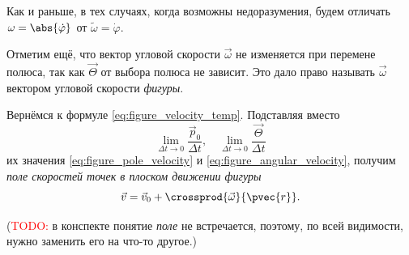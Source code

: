 Как и раньше, в тех случаях, когда возможны недоразумения, будем отличать
$\omega = \abs{\dot{\varphi}}$ от $\tilde{\omega} = \dot{\varphi}$.

Отметим ещё, что вектор угловой скорости $\vec{\omega}$ не изменяется при
перемене полюса, так как $\vec{\Theta}$ от выбора полюса не зависит. Это дало
право называть $\vec{\omega}$ вектором угловой скорости \textit{фигуры}.

Вернёмся к формуле \ref{eq:figure_velocity_temp}. Подставляя вместо
\begin{equation*}
  \lim_{\Delta t \to 0} \frac{\vec{p}_0}{\Delta t}, \quad \lim_{\Delta t \to 0}
  \frac{\vec{\Theta}}{\Delta t}
\end{equation*}
их значения \ref{eq:figure_pole_velocity} и \ref{eq:figure_angular_velocity},
получим \textit{поле скоростей точек в плоском движении фигуры}
\begin{equation}
  \label{eq:figure_velocity}
  \vec{v} = \vec{v}_0 + \crossprod{\vec{\omega}}{\pvec{r}}.
\end{equation}

(\textcolor{red}{TODO:} в конспекте понятие \textit{поле} не встречается,
поэтому, по всей видимости, нужно заменить его на что-то другое.)

\begin{figure}[H]
  \centering

  \caption{}
  \label{fig:16_1}
\end{figure}

